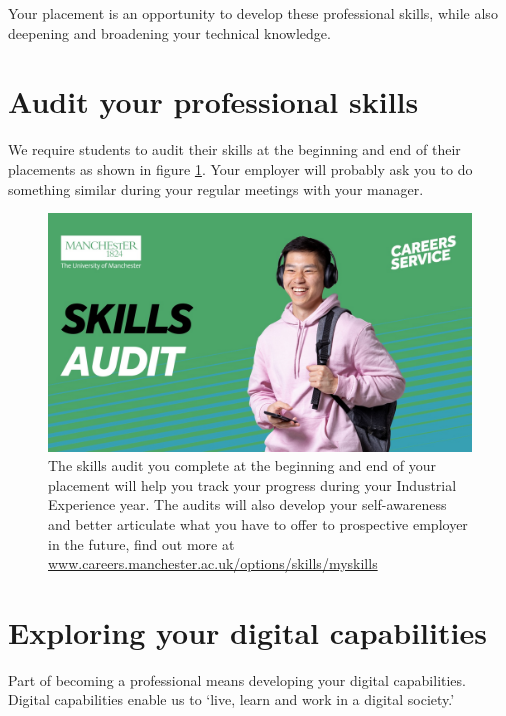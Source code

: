 \documentclass[
]{book}
\begin{document}
Your placement is an opportunity to develop these professional skills, while also deepening and broadening your technical knowledge.

\section{Audit your professional skills}\label{audit}

We require students to audit their skills at the beginning and end of their placements as shown in figure \ref{fig:skillsaudit-fig}. Your employer will probably ask you to do something similar during your regular meetings with your manager.

\begin{figure}

{\centering \includegraphics[width=1\linewidth]{images/skills-audit-graphic} 

}

\caption{The skills audit you complete at the beginning and end of your placement will help you track your progress during your Industrial Experience year. The audits will also develop your self-awareness and better articulate what you have to offer to prospective employer in the future, find out more at \href{https://www.careers.manchester.ac.uk/options/skills/myskills/}{www.careers.manchester.ac.uk/options/skills/myskills} \citep{audit}}\label{fig:skillsaudit-fig}
\end{figure}



\section{Exploring your digital capabilities}\label{digital}

Part of becoming a professional means developing your digital capabilities. Digital capabilities enable us to `live, learn and work in a digital society.'
\end{document}
